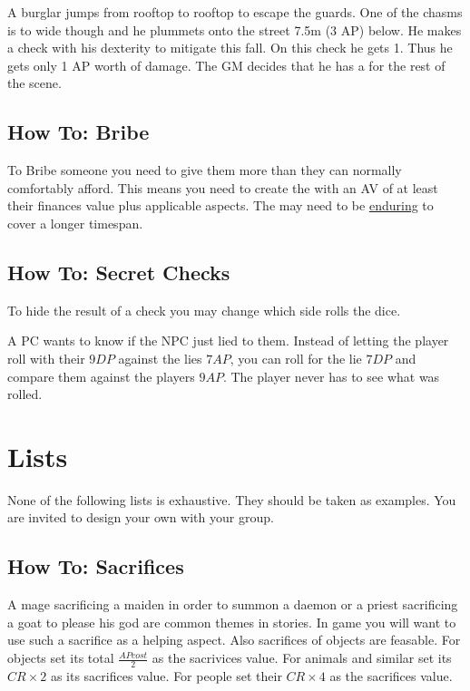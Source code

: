 \documentclass[11pt]{article}
\begin{document}
{\begin{pwexample}
A burglar jumps from rooftop to rooftop to escape the guards. One of the chasms is to wide though and he plummets onto the street 7.5m (3 AP) below. He makes a check with his dexterity to mitigate this fall. On this check he gets 1. Thus he gets only 1 AP worth of damage. The GM decides that he has a  for the rest of the scene.
\end{pwexample}
\subsection{How To: Bribe}
\label{sec:org0ed6797}
To Bribe someone you need to give them more than they can normally comfortably afford. This means you need to create the  with an AV of at least their finances value plus applicable aspects. The  may need to be \hyperref[sec:org97ab889]{enduring} to cover a longer timespan.
\subsection{How To: Secret Checks}
\label{sec:org0d9181a}
To hide the result of a check you may change which side rolls the dice.

\begin{pwexample}
A PC wants to know if the NPC just lied to them. Instead of letting the player roll with their \(9 DP\) against the lies \(7 AP\), you can roll for the lie \(7 DP\) and compare them against the players \(9 AP\). The player never has to see what was rolled.
\end{pwexample}
\section{Lists}
\label{sec:org6f730a1}
None of the following lists is exhaustive. They should be taken as examples. You are invited to design your own with your group.
\subsection{How To: Sacrifices}
\label{sec:org536b4d8}
A mage sacrificing a maiden in order to summon a daemon or a priest sacrificing a goat to please his god are common themes in stories. In game you will want to use such a sacrifice as a helping aspect. Also sacrifices of objects are feasable. For objects set its total \(\frac{AP cost}{2}\) as the sacrivices value. For animals and similar set its \(CR \times 2\) as its sacrifices value. For people set their \(CR \times 4\) as the sacrifices value.
}
\end{document}

